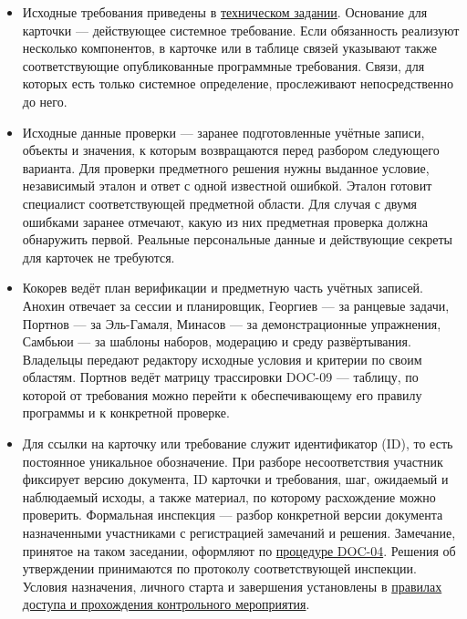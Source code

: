\documentclass[12pt,a4paper]{article}
\newcommand{\tightlist}{\setlength{\itemsep}{0pt}\setlength{\parskip}{0pt}}
\begin{document}
\begin{itemize}
\tightlist
\item
  Исходные требования приведены в {\href{../02\_Техническое\_задание/Техническое\_задание.pdf\#doc-02-техническое-задание}{техническом задании}}. Основание для карточки --- действующее системное требование. Если обязанность реализуют несколько компонентов, в карточке или в таблице связей указывают также соответствующие опубликованные программные требования. Связи, для которых есть только системное определение, прослеживают непосредственно до него.
\item
  Исходные данные проверки --- заранее подготовленные учётные записи, объекты и значения, к которым возвращаются перед разбором следующего варианта. Для проверки предметного решения нужны выданное условие, независимый эталон и ответ с одной известной ошибкой. Эталон готовит специалист соответствующей предметной области. Для случая с двумя ошибками заранее отмечают, какую из них предметная проверка должна обнаружить первой. Реальные персональные данные и действующие секреты для карточек не требуются.
\item
  Кокорев ведёт план верификации и предметную часть учётных записей. Анохин отвечает за сессии и планировщик, Георгиев --- за ранцевые задачи, Портнов --- за Эль-Гамаля, Минасов --- за демонстрационные упражнения, Самбьюи --- за шаблоны наборов, модерацию и среду развёртывания. Владельцы передают редактору исходные условия и критерии по своим областям. Портнов ведёт матрицу трассировки DOC-09 --- таблицу, по которой от требования можно перейти к обеспечивающему его правилу программы и к конкретной проверке.
\item
  Для ссылки на карточку или требование служит идентификатор (ID), то есть постоянное уникальное обозначение. При разборе несоответствия участник фиксирует версию документа, ID карточки и требования, шаг, ожидаемый и наблюдаемый исходы, а также материал, по которому расхождение можно проверить. Формальная инспекция --- разбор конкретной версии документа назначенными участниками с регистрацией замечаний и решения. Замечание, принятое на таком заседании, оформляют по {\href{../06\_Процедура\_формальной\_инспекции/Процедура\_формальной\_инспекции.pdf}{процедуре DOC-04}}. Решения об утверждении принимаются по протоколу соответствующей инспекции. Условия назначения, личного старта и завершения установлены в {\href{../02\_Техническое\_задание/Техническое\_задание.pdf\#правила-доступа-и-прохождения-контрольного-мероприятия}{правилах доступа и прохождения контрольного мероприятия}}.
\end{itemize}
\end{document}
